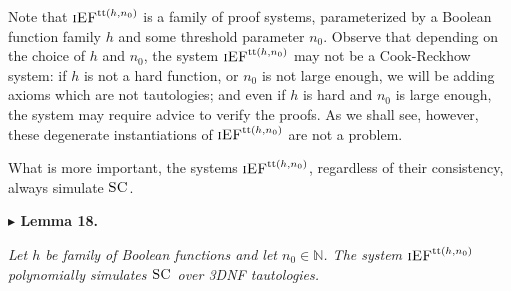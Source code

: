 \documentclass[11pt]{article}
\newcommand{\SC}{\textsc{SC}}
\newcommand{\iEF}{\textsc{iEF}}
\newcommand{\N}{\mathbb{N}}
\newcommand{\iEFtt}[1]{\iEF^{\mathrm{tt}(#1)}}
\newenvironment{statement}[1]%
  {\par\medskip\noindent\textbf{#1}\par\nopagebreak\smallskip\noindent\itshape}%
  {\par\medskip}
\begin{document}
Note that $\iEFtt{h,n_{0}}$ is a family of proof systems, parameterized by a Boolean function
family $h$ and some threshold parameter $n_{0}$. Observe that depending on the choice of $h$ and
$n_{0}$, the system $\iEFtt{h,n_{0}}$ may not be a Cook-Reckhow system: if $h$ is not a hard
function, or $n_{0}$ is not large enough, we will be adding axioms which are not tautologies; and
even if $h$ is hard and $n_{0}$ is large enough, the system may require advice to verify the
proofs. As we shall see, however, these degenerate instantiations of $\iEFtt{h,n_{0}}$ are not a
problem.

What is more important, the systems $\iEFtt{h,n_{0}}$, regardless of their consistency, always
simulate $\SC$.


\begin{statement}{$\blacktriangleright$ Lemma 18.}
Let $h$ be family of Boolean functions and let $n_{0} \in \N$. The system $\iEFtt{h,n_{0}}$
polynomially simulates $\SC$ over 3DNF tautologies.
\end{statement}

\end{document}

